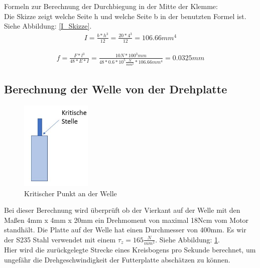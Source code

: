 Formeln zur Berechnung der Durchbiegung in der Mitte der Klemme: \\

Die Skizze zeigt welche Seite h und welche Seite b in der benutzten Formel ist. Siehe Abbildung: \ref{I_Skizze}.
\begin{align*}
I = \frac{b*h^{3}}{12} = \frac{20*4^{3}}{12} = 106.66mm^{4} 
\end{align*}

\begin{align*}
f=\frac{ F*l^{ 3 } }{ 48*E*I} = \frac{10N*100^{3}mm}{48*0.6*10^{5}\frac{N}{mm^{2}}*106.66mm^{4}} = 0.0325mm
\end{align*}

\subsection{Berechnung der Welle von der Drehplatte}

\begin{figure}
\vspace{-80pt}
  \begin{center}
    \includegraphics[width=0.3\textwidth]{Bilder/Powerpoint/Torsionsmoment}
  \end{center}
  \caption{Kritischer Punkt an der Welle}
  \label{Torsionsmoment}
  \vspace{-20pt}
\end{figure}

Bei dieser Berechnung wird überprüft ob der Vierkant auf der Welle mit den Maßen 4mm x 4mm x 20mm ein Drehmoment von maximal 18Ncm vom Motor standhält. Die Platte auf der Welle hat einen Durchmesser von 400mm. Es wir der S235 Stahl verwendet mit einem $\tau_z=165\frac{N}{mm^{2}}$. Siehe Abbildung: \ref{Torsionsmoment}.\\

Hier wird die zurückgelegte Strecke eines Kreisbogens pro Sekunde berechnet, um ungefähr die Drehgeschwindigkeit der Futterplatte abschätzen zu können.

